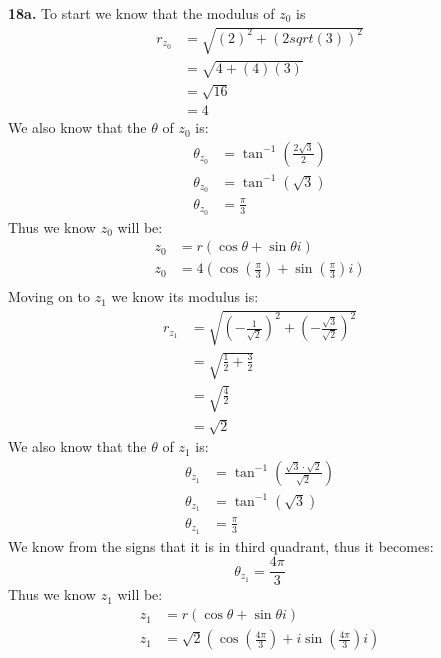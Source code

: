 \documentclass[11pt]{article}
\begin{document}
\parindent=0pt

\textbf{18a.} To start we know that the modulus of $z_0$ is
\begin{align*}
 r_{z_0} & = \sqrt{(2)^2 + (2sqrt(3))^2} \\
& = \sqrt{4 + (4)(3)} \\
& = \sqrt{16} \\
& = 4
\end{align*}
We also know that the $\theta$ of $z_0$ is:
\begin{align*}
 \theta_{z_0} & = \tan^{-1}(\frac{2\sqrt{3}}{2})\\
 \theta_{z_0} & = \tan^{-1}(\sqrt{3})\\
 \theta_{z_0} & = \frac{\pi}{3}
\end{align*}
Thus we know $z_0$ will be:
\begin{align*}
 z_0 & = r(\cos\theta + \sin\theta i) \\
 z_0 & = 4(\cos(\frac{\pi}{3}) + \sin(\frac{\pi}{3})i) \\
\end{align*}
Moving on to $z_1$ we know its modulus is:
\begin{align*}
 r_{z_1} & = \sqrt{(-\frac{1}{\sqrt{2}})^2 + (-\frac{\sqrt{3}}{\sqrt{2}})^2 }\\
& = \sqrt{\frac{1}{2} + \frac{3}{2}} \\
& = \sqrt{\frac{4}{2}} \\
& = \sqrt{2}
\end{align*}
We also know that the $\theta$ of $z_1$ is:
\begin{align*}
 \theta_{z_1} & = \tan^{-1}(\frac{\sqrt{3}\cdot\sqrt{2}}{\sqrt{2}})\\
 \theta_{z_1} & = \tan^{-1}(\sqrt{3})\\
 \theta_{z_1} & = \frac{\pi}{3}
\end{align*}
We know from the signs that it is in third quadrant, thus it becomes:
\[ \theta_{z_1} = \frac{4\pi}{3} \]
Thus we know $z_1$ will be:
\begin{align*}
 z_1 & = r(\cos\theta + \sin\theta i) \\
 z_1 & = \sqrt{2}(\cos(\frac{4\pi}{3}) + i\sin(\frac{4\pi}{3})i) \\
\end{align*} \\\\
\end{document}
